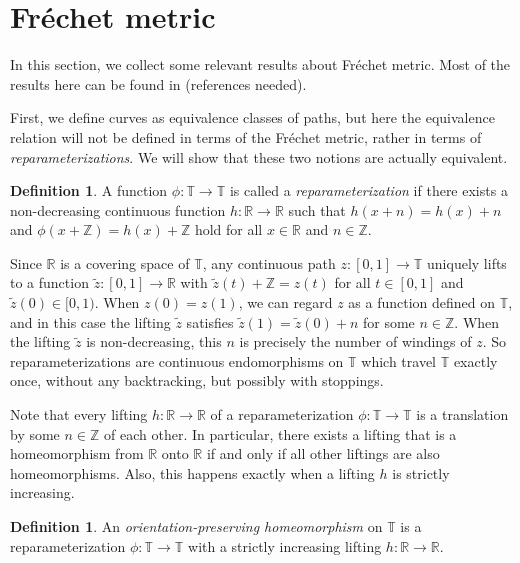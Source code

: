 \documentclass[reqno,centertags,12pt]{amsart}
\theoremstyle{definition}
\newtheorem{definition}[theorem]{Definition}
\numberwithin{equation}{section}
\newcommand{\bbR}{{\mathbb{R}}}
\newcommand{\bbZ}{{\mathbb{Z}}}
\newcommand{\bbT}{{\mathbb{T}}}
\begin{document}
\appendix

\section{Fr\'{e}chet metric}\label{SA}

In this section, we collect some relevant results about Fr\'{e}chet metric.
Most of the results here can be found in (references needed).

First, we define curves as equivalence classes of paths, but here
the equivalence relation will not be defined in terms of the Fr\'{e}chet metric,
rather in terms of \emph{reparameterizations}. We will show that
these two notions are actually equivalent.

\begin{definition}
	A function $\phi\colon\bbT\to\bbT$ is called a \emph{reparameterization} if
	there exists a non-decreasing continuous function $h\colon\bbR\to\bbR$ such that
	$h(x+n) = h(x) + n$ and $\phi(x+\bbZ) = h(x) + \bbZ$ hold for all $x\in\bbR$ and $n\in\bbZ$.
\end{definition}

Since $\bbR$ is a covering space of $\bbT$, any continuous path
$z\colon[0,1]\to\bbT$ uniquely lifts to a function
$\tilde{z}\colon[0,1]\to\bbR$ with $\tilde{z}(t)+\bbZ = z(t)$ for all $t\in[0,1]$
and $\tilde{z}(0)\in[0,1)$. When $z(0) = z(1)$, we can regard $z$ as a function
defined on $\bbT$, and in this case the lifting $\tilde{z}$ satisfies
$\tilde{z}(1) = \tilde{z}(0)+n$ for some $n\in\bbZ$. When the lifting $\tilde{z}$ is
non-decreasing, this $n$ is precisely the number of windings of $z$.
So reparameterizations are continuous endomorphisms on $\bbT$ which travel
$\bbT$ exactly once, without any backtracking, but possibly with stoppings.

Note that every lifting $h\colon\bbR\to\bbR$ of a reparameterization $\phi\colon\bbT\to\bbT$
is a translation by some $n\in\bbZ$ of each other. In particular, there exists a lifting
that is a homeomorphism from $\bbR$ onto $\bbR$ if and only if all other liftings are
also homeomorphisms. Also, this happens exactly when a lifting $h$ is strictly increasing.

\begin{definition}
	An \emph{orientation-preserving homeomorphism} on $\bbT$ is a reparameterization
	$\phi\colon\bbT\to\bbT$ with a strictly increasing lifting $h\colon\bbR\to\bbR$.
\end{definition}
\end{document}
